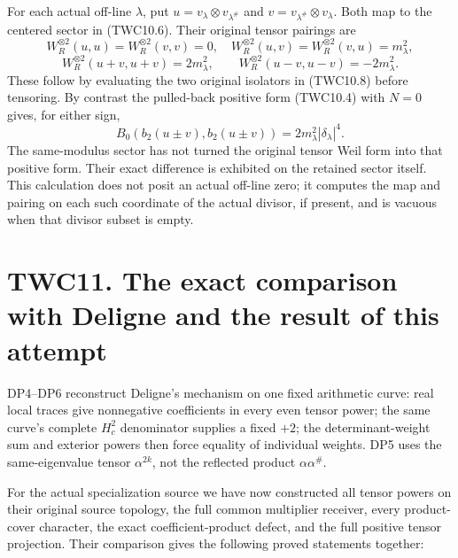 For each actual off-line \(\lambda\), put
\(u=v_\lambda\otimes v_{\lambda^\#}\) and
\(v=v_{\lambda^\#}\otimes v_\lambda\). Both map to the centered sector
in (TWC10.6). Their original tensor pairings are \[
W_R^{\otimes2}(u,u)=W_R^{\otimes2}(v,v)=0,
\quad W_R^{\otimes2}(u,v)=W_R^{\otimes2}(v,u)=m_\lambda^2,
\] \[
\boxed{\quad W_R^{\otimes2}(u+v,u+v)=2m_\lambda^2,
\qquad W_R^{\otimes2}(u-v,u-v)=-2m_\lambda^2.\quad}
\tag{TWC10.11}
\] These follow by evaluating the two original isolators in (TWC10.8)
before tensoring. By contrast the pulled-back positive form (TWC10.4)
with \(N=0\) gives, for either sign, \[
B_0(b_2(u\pm v),b_2(u\pm v))=2m_\lambda^2|\delta_\lambda|^4.
\tag{TWC10.12}
\] The same-modulus sector has not turned the original tensor Weil form
into that positive form. Their exact difference is exhibited on the
retained sector itself. This calculation does not posit an actual
off-line zero; it computes the map and pairing on each such coordinate
of the actual divisor, if present, and is vacuous when that divisor
subset is empty.

\section{TWC11. The exact comparison with Deligne and the result of this
attempt}\label{twc11.-the-exact-comparison-with-deligne-and-the-result-of-this-attempt}

DP4--DP6 reconstruct Deligne's mechanism on one fixed arithmetic curve:
real local traces give nonnegative coefficients in every even tensor
power; the same curve's complete \(H_c^2\) denominator supplies a fixed
\(+2\); the determinant-weight sum and exterior powers then force
equality of individual weights. DP5 uses the same-eigenvalue tensor
\(\alpha^{2k}\), not the reflected product \(\alpha\alpha^\#\).

For the actual specialization source we have now constructed all tensor
powers on their original source topology, the full common multiplier
receiver, every product-cover character, the exact coefficient-product
defect, and the full positive tensor projection. Their comparison gives
the following proved statements together:

